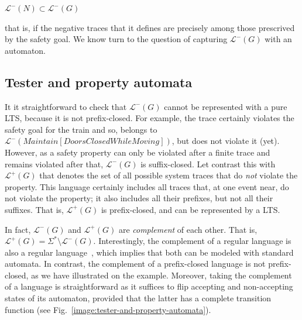 \begin{center}
$\mathcal{L}^{-}(N) \subset \mathcal{L}^{-}(G)$
\end{center}

\noindent that is, if the negative traces that it defines are precisely among those prescrived by the safety goal. We know turn to the question of capturing $\mathcal{L}^{-}(G)$ with an automaton.

\subsection{Tester and property automata}

It it straightforward to check that $\mathcal{L}^{-}(G)$ cannot be represented with a pure LTS, because it is not prefix-closed. For example, the trace  certainly violates the safety goal for the train and so, belongs to $\mathcal{L}^{-}(Maintain[DoorsClosed While Moving])$, but  does not violate it (yet). However, as a safety property can only be violated after a finite trace and remains violated after that, $\mathcal{L}^{-}(G)$ is suffix-closed. Let contrast this with $\mathcal{L}^{+}(G)$ that denotes the set of all possible system traces that do \emph{not} violate the property. This language certainly includes all traces that, at one event near, do not violate the property; it also includes all their prefixes, but not all their suffixes. That is, $\mathcal{L}^{+}(G)$ is prefix-closed, and can be represented by a LTS. 

In fact, $\mathcal{L}^{-}(G)$ and $\mathcal{L}^{+}(G)$ are \emph{complement} of each other. That is, $\mathcal{L}^{+}(G) = \Sigma^{*} \setminus \mathcal{L}^{-}(G)$. Interestingly, the complement of a regular language is also a regular language~\cite{Hopcroft:1979}, which implies that both can be modeled with standard automata. In contrast, the complement of a prefix-closed language is not prefix-closed, as we have illustrated on the example. Moreover, taking the complement of a language is straightforward as it suffices to flip accepting and non-accepting states of its automaton, provided that the latter has a complete transition function (see Fig.~\ref{image:tester-and-property-automata}). 

